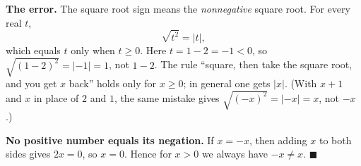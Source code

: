 \textbf{The error.} The square root sign means the \emph{nonnegative} square root. For every real $t$,
\[
\sqrt{t^2}=|t| ,
\]
which equals $t$ only when $t\ge0$. Here $t=1-2=-1<0$, so $\sqrt{(1-2)^2}=|-1|=1$, not $1-2$. The rule ``square, then take the square root, and you get $x$ back'' holds only for $x\ge0$; in general one gets $|x|$. (With $x+1$ and $x$ in place of $2$ and $1$, the same mistake gives $\sqrt{(-x)^2}=|-x|=x$, not $-x$.)

\textbf{No positive number equals its negation.} If $x=-x$, then adding $x$ to both sides gives $2x=0$, so $x=0$. Hence for $x>0$ we always have $-x\ne x$. $\blacksquare$
